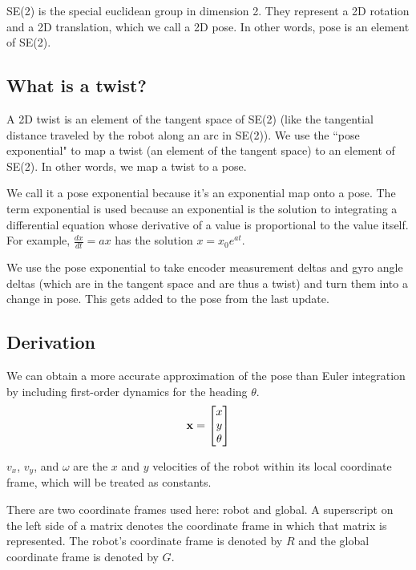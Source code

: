 SE(2) is the special euclidean group in dimension 2. They represent a 2D
rotation and a 2D translation, which we call a 2D pose. In other words, pose is
an element of SE(2).

\subsection{What is a twist?}

A 2D twist is an element of the tangent space of SE(2) (like the tangential
distance traveled by the robot along an arc in SE(2)). We use the ``pose
exponential" to map a twist (an element of the tangent space) to an element of
SE(2). In other words, we map a twist to a pose.

We call it a pose exponential because it's an exponential map onto a pose. The
term exponential is used because an exponential is the solution to integrating a
differential equation whose derivative of a value is proportional to the value
itself. For example, $\frac{dx}{dt} = ax$ has the solution $x = x_0 e^{at}$.

We use the pose exponential to take encoder measurement deltas and gyro angle
deltas (which are in the tangent space and are thus a twist) and turn them into
a change in pose. This gets added to the pose from the last update.

\subsection{Derivation}

We can obtain a more accurate approximation of the pose than Euler integration
by including first-order dynamics for the heading $\theta$.
\begin{equation*}
  \mathbf{x} = \begin{bmatrix}
    x \\
    y \\
    \theta
  \end{bmatrix}
\end{equation*}

$v_x$, $v_y$, and $\omega$ are the $x$ and $y$ velocities of the robot within
its local coordinate frame, which will be treated as constants.
\begin{remark}
  There are two coordinate frames used here: robot and global. A superscript on
  the left side of a matrix denotes the coordinate frame in which that matrix is
  represented. The robot's coordinate frame is denoted by $R$ and the global
  coordinate frame is denoted by $G$.
\end{remark}

